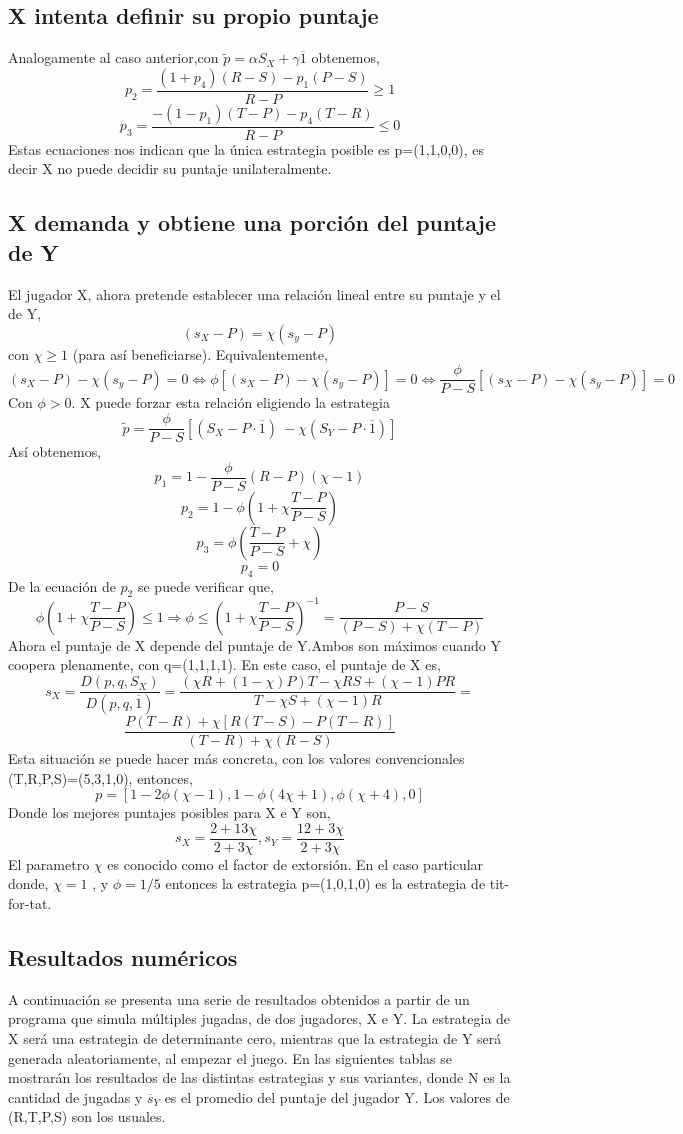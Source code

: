 \documentclass[12pt]{article}
\begin{document}
\subsection{X intenta definir su propio puntaje}
Analogamente al caso anterior,con $\tilde{p}=\alpha S_X + \gamma\overline1$  obtenemos,
$$p_2=\frac{(1+p_4)(R-S)-p_1(P-S)}{R-P}\geq 1$$
$$p_3=\frac{-(1-p_1)(T-P)-p_4(T-R)}{R-P}\leq 0$$
Estas ecuaciones nos indican que la única estrategia posible es p=(1,1,0,0), es decir
X no puede decidir su puntaje unilateralmente.


\subsection{X demanda y obtiene una porción del puntaje de Y}
El jugador X, ahora pretende establecer una relación lineal entre su puntaje y el de Y,
$$(s_X -P)=\chi (s_y-P)$$
con $\chi \geq 1$ (para así beneficiarse). Equivalentemente,
$$(s_X -P)-\chi (s_y-P)=0 \Leftrightarrow \phi[(s_X -P)-\chi (s_y-P)]=0 \Leftrightarrow \frac{\phi}{P-S}[(s_X -P)-\chi (s_y-P)]=0$$
Con $\phi>0$. X puede forzar esta relación eligiendo la estrategia
$$\tilde{p}=\frac{\phi}{P-S}[(S_X-P\cdot\overline1)\ - \chi (S_Y-P\cdot\overline1)]$$
Así obtenemos,
$$p_1=1-\frac{\phi}{P-S}(R-P)(\chi-1)$$
$$p_2=1-\phi(1+\chi \frac{T-P}{P-S})$$
$$p_3=\phi(\frac{T-P}{P-S}+\chi )$$
$$p_4=0$$
De la ecuación de $p_2$ se puede verificar que,
$$\phi(1+\chi\frac{T-P}{P-S})\leq 1 \Rightarrow \phi\leq(1+\chi \frac{T-P}{P-S})^{-1}=\frac{P-S}{(P-S) + \chi(T-P)}$$
Ahora el puntaje de X depende del puntaje de Y.Ambos son máximos cuando Y coopera plenamente, con
q=(1,1,1,1). En este caso, el puntaje de X es,
$$s_X= \frac{D(p,q,S_X)}{D(p,q,\overline1)}=\frac{(\chi R + (1-\chi)P)T-\chi RS+(\chi-1)PR}{T-\chi S+(\chi-1)R}=$$
$$\frac{P(T-R)+\chi[R(T-S)-P(T-R)]}{(T-R)+\chi(R-S)}$$
Esta situación se puede hacer más concreta, con los valores convencionales (T,R,P,S)=(5,3,1,0), entonces,
$$p=[1-2\phi(\chi-1),1-\phi(4 \chi+1),\phi(\chi+4),0]$$
Donde los mejores puntajes posibles para X e Y son,
$$s_X=\frac{2+13\chi}{2+3\chi}, s_Y=\frac{12+3\chi}{2+3\chi}$$
El parametro $\chi$ es conocido como el factor de extorsión. En el caso particular donde, $\chi=1$ , y $\phi =1/5$
entonces la estrategia p=(1,0,1,0) es la estrategia de tit-for-tat.



\subsection{Resultados numéricos}
A continuación se presenta una serie de resultados obtenidos a partir de un programa que simula múltiples jugadas, de dos
jugadores, X e Y. La estrategia de X será una estrategia de determinante cero, mientras que la estrategia de Y será 
generada aleatoriamente, al empezar el juego.
En las siguientes tablas se mostrarán los resultados de las distintas estrategias y sus variantes, donde N es la cantidad de
jugadas y $\overline s_Y$ es el promedio del puntaje del jugador Y. Los valores de (R,T,P,S) son los usuales.\newpage
\end{document}
